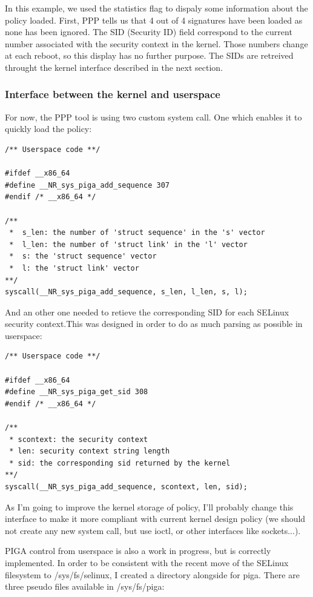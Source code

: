 \documentclass[pdftex,a4paper,titlepage,11pt]{article}
\begin{document}
\smallskip

In this example, we used the statistics flag to dispaly some information about
the policy loaded. First, PPP tells us that 4 out of 4 signatures have been
loaded as none has been ignored. The SID (Security ID) field correspond to the
current number associated with the security context in the kernel. Those numbers
change at each reboot, so this display has no further purpose. The SIDs are
retreived throught the kernel interface described in the next section.

\subsubsection{Interface between the kernel and userspace}

For now, the PPP tool is using two custom system call. One which enables it to
quickly load the policy:

\begin{lstlisting}
/** Userspace code **/

#ifdef __x86_64
#define __NR_sys_piga_add_sequence 307
#endif /* __x86_64 */

/**
 *  s_len: the number of 'struct sequence' in the 's' vector
 *  l_len: the number of 'struct link' in the 'l' vector
 *  s: the 'struct sequence' vector
 *  l: the 'struct link' vector
**/
syscall(__NR_sys_piga_add_sequence, s_len, l_len, s, l);
\end{lstlisting}

And an other one needed to retieve the corresponding SID for each SELinux
security context.This was designed in order to do as much parsing as possible in
userspace:

\begin{lstlisting}
/** Userspace code **/

#ifdef __x86_64
#define __NR_sys_piga_get_sid 308
#endif /* __x86_64 */

/**
 * scontext: the security context
 * len: security context string length
 * sid: the corresponding sid returned by the kernel
**/
syscall(__NR_sys_piga_add_sequence, scontext, len, sid);
\end{lstlisting}

As I'm going to improve the kernel storage of policy, I'll probably change this
interface to make it more compliant with current kernel design policy (we should
not create any new system call, but use ioctl, or other interfaces like
sockets...).

PIGA control from userspace is also a work in progress, but is correctly
implemented. In order to be consistent with the recent move of the SELinux
filesystem to /sys/fs/selinux, I created a directory alongside for piga. There
are three pseudo files available in /sys/fs/piga:
\end{document}
